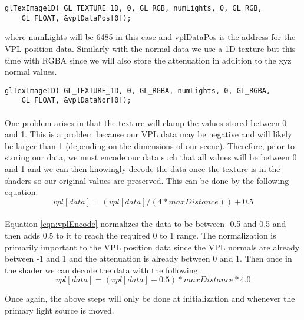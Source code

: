 \begin{lstlisting}
glTexImage1D( GL_TEXTURE_1D, 0, GL_RGB, numLights, 0, GL_RGB, 
	GL_FLOAT, &vplDataPos[0]);
\end{lstlisting}

where numLights will be 6485 in this case and vplDataPos is the address for the VPL position data.  Similarly with the normal data we use a 1D texture but this time with RGBA since we will also store the attenuation in addition to the xyz normal values.

\begin{lstlisting}
glTexImage1D( GL_TEXTURE_1D, 0, GL_RGBA, numLights, 0, GL_RGBA, 
	GL_FLOAT, &vplDataNor[0]);
\end{lstlisting}
\paragraph{}
One problem arises in that the texture will clamp the values stored between 0 and 1.  This is a problem because our VPL data may be negative and will likely be larger than 1 (depending on the dimensions of our scene).  Therefore, prior to storing our data, we must encode our data such that all values will be between 0 and 1 and we can then knowingly decode the data once the texture is in the shaders so our original values are preserved.  This can be done by the following equation:
\begin{equation}
vpl[data] = (vpl[data]/(4*maxDistance))+0.5 \label{eqn:vplEncode}
\end{equation}

\paragraph{}
Equation \ref{eqn:vplEncode} normalizes the data to be between -0.5 and 0.5 and then adds 0.5 to it to reach the required 0 to 1 range.  The normalization is primarily important to the VPL position data since the VPL normals are already between -1 and 1 and the attenuation is already between 0 and 1. Then once in the shader we can decode the data with the following:
\begin{equation}
vpl[data] = (vpl[data]-0.5)*maxDistance*4.0 \label{eqn:vplDecode}
\end{equation}

Once again, the above steps will only be done at initialization and whenever the primary light source is moved.

